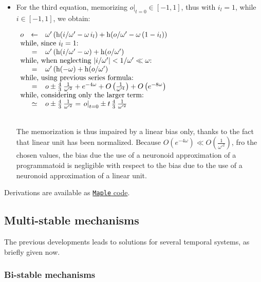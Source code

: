 \documentclass[a4]{article} \usepackage[left=2cm,right=3cm,top=1cm,bottom=2cm]{geometry}
\newcommand{\eqline}[1]{~\vspace{0.1cm}\\\centerline{$#1$}\vspace{0.1cm}\\}
\begin{document}
\begin{itemize}
\item For the third equation, memorizing $\left.o\right|_{t=0} \in [-1, 1]$, thus with $i_l = 1$, while $i  \in [-1, 1]$, we obtain:
\eqline{\begin{array}{rcl}
    o &\leftarrow& \omega' \, (\mbox{h}(i/\omega' -  \omega \, i_l) + \mbox{h}(o /\omega' -  \omega \, (1 - i_l)) \\
    \multicolumn{3}{l}{\mbox{while, since $i_l = 1$:}} \\
    &=& \omega' \, (\mbox{h}(i/\omega' -  \omega) + \mbox{h}(o /\omega') \\
    \multicolumn{3}{l}{\mbox{while, when neglecting $|i/\omega'| < 1/\omega' \ll \omega$:}} \\
    &=& \omega' \, (\mbox{h}(-\omega) + \mbox{h}(o /\omega') \\
    \multicolumn{3}{l}{\mbox{while, using previous series formula:}} \\
    &=& o \pm \frac{4}{3} \, \frac{1}{\omega'^2} + e^{-4 \omega} + O\left(\frac{1}{\omega'^4}\right) + O\left(e^{-8 \omega}\right) \\
     \multicolumn{3}{l}{\mbox{while, considering only the larger term:}} \\
    &\simeq& o \pm \frac{4}{3} \, \frac{1}{\omega'^2}  = \left.o\right|_{t=0} \pm t \, \frac{4}{3} \, \frac{1}{\omega'^2} \\
 \end{array}}
The memorization is thus impaired by a linear bias only, thanks to the fact that linear unit has been normalized. Because $O\left(e^{-4 \omega}\right) \ll O\left(\frac{1}{\omega'^2}\right)$, fro the chosen values, the bias due the use of a neuronoid approximation of a programmatoid is negligible with respect to the bias due to the use of a neuronoid approximation of a linear unit.
\end{itemize}

Derivations are available as \href{https://raw.githubusercontent.com/vthierry/braincraft/master/doc/tex/memorygate.mpl.out.txt}{{\tt Maple} code}.

\subsection{Multi-stable mechanisms}

The previous developments leads to solutions for several temporal systems, as briefly given now.

\subsubsection{Bi-stable mechanisms}
\end{document}
